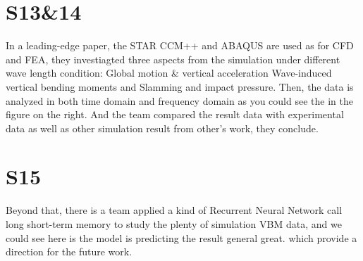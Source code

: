 \documentclass[17pt]{extarticle} %
\begin{document}
\section*{S13\&14}
In a leading-edge paper, the STAR CCM++ and ABAQUS are used as for CFD and FEA, they investiagted three aspects from the simulation under different wave length condition: Global motion \& vertical acceleration
Wave-induced vertical bending moments and Slamming and impact pressure. Then, the data is analyzed in both time domain and frequency domain as you could see the in the figure on the right. And the team compared the 
result data with experimental data as well as other simulation result from other's work, they conclude.
\section*{S15}
Beyond that, there is a team applied a kind of Recurrent Neural Network call long short-term memory to study the plenty of simulation VBM data, and we could see here is the model is predicting the result general great. which
provide a direction for the future work.
\end{document}
